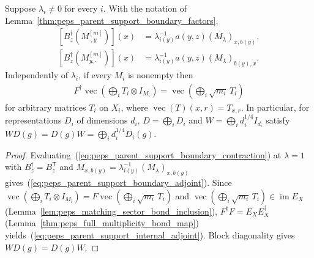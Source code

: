 \begin{lemma}%
    \label{thm:peps_parent_support_boundary_adjoints}
    \leanok
    Suppose $\lambda_i\ne0$ for every $i$. With the notation of
    Lemma~\ref{thm:peps_parent_support_boundary_factors},
    \begin{align}
        \left[B_z^\dagger(M^{[m]}_{\cdot,y})\right](x)
         & =\lambda_{i(y)}^{-1}a(y,z)(M_\lambda)_{x,b(y)}, \\
        \left[B_z^\dagger(M^{[m]}_{y,\cdot})\right](x)
         & =\lambda_{i(y)}^{-1}a(y,z)(M_\lambda)_{b(y),x}.
        \label{eq:peps_parent_support_boundary_adjoint}
    \end{align}
    Independently of $\lambda_i$, if every $M_i$ is nonempty then
    \begin{align}
        F^\dagger\operatorname{vec}\left(\bigoplus_i T_i\otimes I_{M_i}\right)
        =\operatorname{vec}\left(\bigoplus_i\sqrt{m_i}\,T_i\right)
        \label{eq:peps_parent_support_internal_adjoint}
    \end{align}
    for arbitrary matrices $T_i$ on $X_i$, where
    $\operatorname{vec}(T)(x,r)=T_{x,r}$.
    In particular, for representations $D_i$ of dimensions $d_i$,
    $D=\bigoplus_iD_i$ and $W=\bigoplus_i d_i^{1/4}I_{d_i}$ satisfy
    $WD(g)=D(g)W=\bigoplus_i d_i^{1/4}D_i(g)$.
\end{lemma}
\begin{proof}\leanok
    Evaluating~(\ref{eq:peps_parent_support_boundary_contraction}) at $\lambda=1$
    with $B_z^\dagger=B_z^{\mathsf T}$ and
    $M_{x,b(y)}=\lambda_{i(y)}^{-1}(M_\lambda)_{x,b(y)}$ gives~(\ref{eq:peps_parent_support_boundary_adjoint}).
    Since $\operatorname{vec}(\bigoplus_i T_i\otimes I_{M_i})=F\operatorname{vec}(\bigoplus_i\sqrt{m_i}\,T_i)$
    and $\operatorname{vec}(\bigoplus_i\sqrt{m_i}\,T_i)\in\operatorname{im}E_X$
    (Lemma~\ref{lem:peps_matching_sector_bond_inclusion}),
    $F^\dagger F=E_XE_X^\dagger$ (Lemma~\ref{thm:peps_full_multiplicity_bond_map})
    yields~(\ref{eq:peps_parent_support_internal_adjoint}). Block diagonality
    gives $WD(g)=D(g)W$.
\end{proof}

